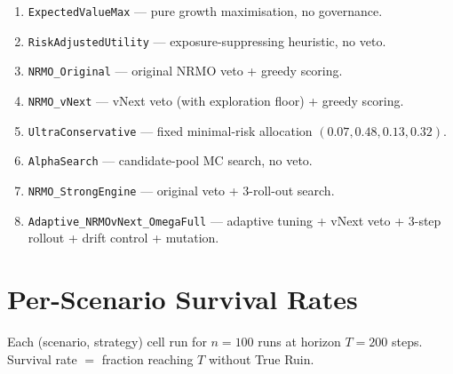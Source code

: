 \begin{enumerate}[label=\arabic*., itemsep=2pt]
\item \texttt{ExpectedValueMax} --- pure growth maximisation, no
governance.
\item \texttt{RiskAdjustedUtility} --- exposure-suppressing
heuristic, no veto.
\item \texttt{NRMO\_Original} --- original NRMO veto + greedy
scoring.
\item \texttt{NRMO\_vNext} --- vNext veto (with exploration floor) +
greedy scoring.
\item \texttt{UltraConservative} --- fixed minimal-risk allocation
$(0.07, 0.48, 0.13, 0.32)$.
\item \texttt{AlphaSearch} --- candidate-pool MC search, no veto.
\item \texttt{NRMO\_StrongEngine} --- original veto + 3-roll-out
search.
\item \texttt{Adaptive\_NRMOvNext\_OmegaFull} --- adaptive tuning +
vNext veto + 3-step rollout + drift control + mutation.
\end{enumerate}

\section{Per-Scenario Survival Rates}
\label{sec:hist-survival}

Each (scenario, strategy) cell run for $n = 100$ runs at horizon
$T = 200$ steps. Survival rate $=$ fraction reaching $T$ without
True Ruin.

